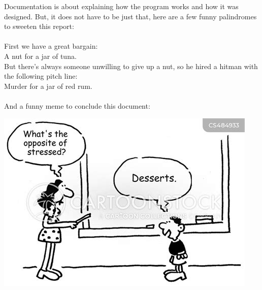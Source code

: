 \documentclass[letterpaper, 10pt]{article}
\begin{document}
Documentation is about explaining how the program works and how it was designed. But, it does not have to be just that, here are a few funny palindromes to sweeten this report:
\\
\\ %
First we have a great bargain:\\
A nut for a jar of tuna.\\
But there's always someone unwilling to give up a nut, so he hired a hitman with the following pitch line:\\
Murder for a jar of red rum.
\\
\\
And a funny meme to conclude this document:\\
\begin{center}
    \includegraphics[scale=0.3]{images/palindromeMeme.jpg}
\end{center}
\end{document}
